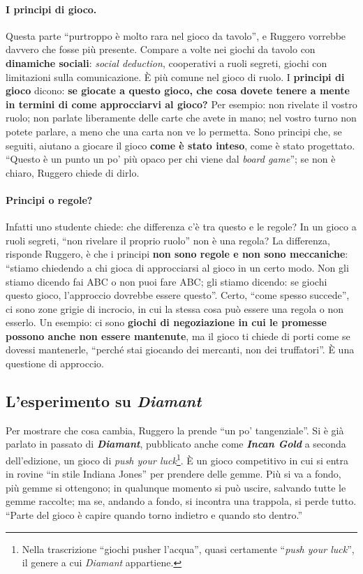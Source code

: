 \paragraph{I principi di gioco.} Questa parte ``purtroppo è molto rara nel gioco da
tavolo'', e Ruggero vorrebbe davvero che fosse più presente. Compare a volte nei giochi
da tavolo con \textbf{dinamiche sociali}: \emph{social deduction}, cooperativi a ruoli
segreti, giochi con limitazioni sulla comunicazione. È più comune nel gioco di ruolo. I
\textbf{principi di gioco} dicono: \textbf{se giocate a questo gioco, che cosa dovete
tenere a mente in termini di come approcciarvi al gioco?} Per esempio: non rivelate il
vostro ruolo; non parlate liberamente delle carte che avete in mano; nel vostro turno
non potete parlare, a meno che una carta non ve lo permetta. Sono principi che, se
seguiti, aiutano a giocare il gioco \textbf{come è stato inteso}, come è stato
progettato. ``Questo è un punto un po' più opaco per chi viene dal \emph{board game}'';
se non è chiaro, Ruggero chiede di dirlo.

\paragraph{Principi o regole?} Infatti uno studente chiede: che differenza c'è tra
questo e le regole? In un gioco a ruoli segreti, ``non rivelare il proprio ruolo'' non è
una regola? La differenza, risponde Ruggero, è che i principi \textbf{non sono regole e
non sono meccaniche}: ``stiamo chiedendo a chi gioca di approcciarsi al gioco in un certo
modo. Non gli stiamo dicendo fai ABC o non puoi fare ABC; gli stiamo dicendo: se giochi
questo gioco, l'approccio dovrebbe essere questo''. Certo, ``come spesso succede'', ci
sono zone grigie di incrocio, in cui la stessa cosa può essere una regola o non esserlo.
Un esempio: ci sono \textbf{giochi di negoziazione in cui le promesse possono anche non
essere mantenute}, ma il gioco ti chiede di porti come se dovessi mantenerle, ``perché
stai giocando dei mercanti, non dei truffatori''. È una questione di approccio.

\subsection{L'esperimento su \emph{Diamant}}

Per mostrare che cosa cambia, Ruggero la prende ``un po' tangenziale''. Si è già parlato
in passato di \textbf{\emph{Diamant}}, pubblicato anche come \textbf{\emph{Incan
Gold}} a seconda dell'edizione, un gioco di \emph{push your luck}\footnote{Nella trascrizione ``giochi
pusher l'acqua'', quasi certamente ``\emph{push your luck}'', il genere a cui
\emph{Diamant} appartiene.}. È un gioco
competitivo in cui si entra in rovine ``in stile Indiana Jones'' per prendere delle
gemme. Più si va a fondo, più gemme si ottengono; in qualunque momento si può uscire,
salvando tutte le gemme raccolte; ma se, andando a fondo, si incontra una trappola, si
perde tutto. ``Parte del gioco è capire quando torno indietro e quando sto dentro.''

